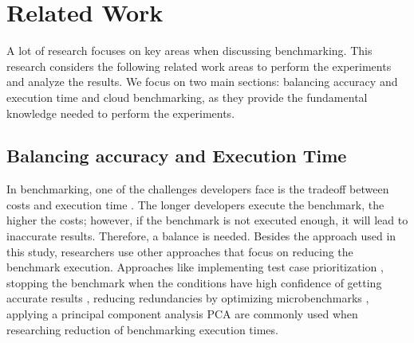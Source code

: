 \section{Related Work}
\label{cha:relatedWork}
A lot of research focuses on key areas when discussing benchmarking. This research considers the following related work areas to perform the experiments and analyze the results. We focus on two main sections: balancing accuracy and execution time and cloud benchmarking, as they provide the fundamental knowledge needed to perform the experiments. 

\subsection{Balancing accuracy and Execution Time}
In benchmarking, one of the challenges developers face is the tradeoff between costs and execution time \cite{japke2023earlymicrobenchmarkcatches, grambow, grambow2021usingApplication, alghamdi2023towards, laaber2021applyingtcp, he2019statistics, grambow2020benchmarkingMicroservicesperformance}. The longer developers execute the benchmark, the higher the costs; however, if the benchmark is not executed enough, it will lead to inaccurate results. Therefore, a balance is needed. Besides the approach used in this study, researchers use other approaches that focus on reducing the benchmark execution. Approaches like implementing test case prioritization \cite{laaber2021applyingtcp, laaber2019continuous, mostafa2017perfrankerprioritization, laaber2022multi}, stopping the benchmark when the conditions have high confidence of getting accurate results \cite{he2019statistics}, reducing redundancies by optimizing microbenchmarks \cite{grambow, grambow2021usingApplication, de2017perphecyperformance}, applying a principal component analysis \ac{PCA} \cite{trancoso2005reducingTPC} are commonly used when researching reduction of benchmarking execution times.\\
